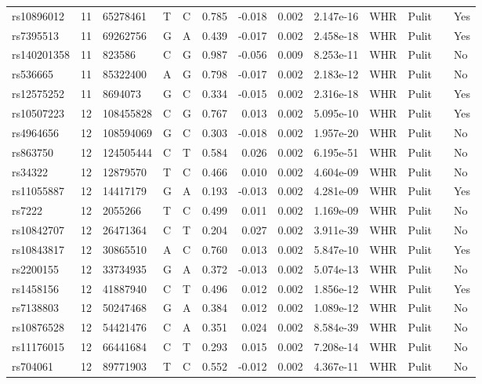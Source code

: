 \documentclass[11pt,twoside]{bristolthesis}
\begin{document}
\begin{longtable}[t]{lrlllrrrlllll}
rs10896012 & 11 & 65278461 & T & C & 0.785 & -0.018 & 0.002 & 2.147e-16 & WHR & Pulit &  & Yes\\
\addlinespace
rs7395513 & 11 & 69262756 & G & A & 0.439 & -0.017 & 0.002 & 2.458e-18 & WHR & Pulit &  & Yes\\
rs140201358 & 11 & 823586 & C & G & 0.987 & -0.056 & 0.009 & 8.253e-11 & WHR & Pulit &  & No\\
rs536665 & 11 & 85322400 & A & G & 0.798 & -0.017 & 0.002 & 2.183e-12 & WHR & Pulit &  & No\\
rs12575252 & 11 & 8694073 & G & C & 0.334 & -0.015 & 0.002 & 2.316e-18 & WHR & Pulit &  & Yes\\
rs10507223 & 12 & 108455828 & C & G & 0.767 & 0.013 & 0.002 & 5.095e-10 & WHR & Pulit &  & Yes\\
\addlinespace
rs4964656 & 12 & 108594069 & G & C & 0.303 & -0.018 & 0.002 & 1.957e-20 & WHR & Pulit &  & No\\
rs863750 & 12 & 124505444 & C & T & 0.584 & 0.026 & 0.002 & 6.195e-51 & WHR & Pulit &  & No\\
rs34322 & 12 & 12879570 & T & C & 0.466 & 0.010 & 0.002 & 4.604e-09 & WHR & Pulit &  & No\\
rs11055887 & 12 & 14417179 & G & A & 0.193 & -0.013 & 0.002 & 4.281e-09 & WHR & Pulit &  & Yes\\
rs7222 & 12 & 2055266 & T & C & 0.499 & 0.011 & 0.002 & 1.169e-09 & WHR & Pulit &  & No\\
\addlinespace
rs10842707 & 12 & 26471364 & C & T & 0.204 & 0.027 & 0.002 & 3.911e-39 & WHR & Pulit &  & No\\
rs10843817 & 12 & 30865510 & A & C & 0.760 & 0.013 & 0.002 & 5.847e-10 & WHR & Pulit &  & Yes\\
rs2200155 & 12 & 33734935 & G & A & 0.372 & -0.013 & 0.002 & 5.074e-13 & WHR & Pulit &  & No\\
rs1458156 & 12 & 41887940 & C & T & 0.496 & 0.012 & 0.002 & 1.856e-12 & WHR & Pulit &  & Yes\\
rs7138803 & 12 & 50247468 & G & A & 0.384 & 0.012 & 0.002 & 1.089e-12 & WHR & Pulit &  & No\\
\addlinespace
rs10876528 & 12 & 54421476 & C & A & 0.351 & 0.024 & 0.002 & 8.584e-39 & WHR & Pulit &  & No\\
rs11176015 & 12 & 66441684 & C & T & 0.293 & 0.015 & 0.002 & 7.208e-14 & WHR & Pulit &  & No\\
rs704061 & 12 & 89771903 & T & C & 0.552 & -0.012 & 0.002 & 4.367e-11 & WHR & Pulit &  & No\\

\end{longtable}
\end{document}
